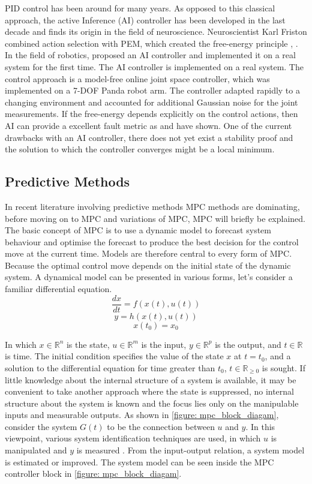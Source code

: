 \ac{PID} control has been around for many years. As opposed to this classical approach, the active Inference (AI) controller has been developed in the last decade and finds its origin in the field of neuroscience. Neuroscientist Karl Friston combined action selection with \ac{PEM}, which created the free-energy principle \cite{friston_free-energy_2009}, \cite{friston_action_2010}. In the field of robotics, \cite{pezzato_novel_2020} proposed an AI controller and implemented it on a real system for the first time. The AI controller is implemented on a real system. The control approach is a model-free online joint space controller, which was implemented on a 7-DOF Panda robot arm. The controller adapted rapidly to a changing environment and accounted for additional Gaussian noise for the joint measurements. If the free-energy depends explicitly on the control actions, then AI can provide a excellent fault metric as \cite{baioumy_fault-tolerant_2021} and \cite{pezzato_active_2021} have shown. One of the current drawbacks with an AI controller, there does not yet exist a stability proof and the solution to which the controller converges might be a local minimum. 
 
\subsection{Predictive Methods}
\label{subsection: predictive_methods}
In recent literature involving predictive methods \acf{MPC} methods are dominating, before moving on to \ac{MPC} and variations of \ac{MPC}, \ac{MPC} will briefly be explained.  The basic concept of \ac{MPC} is to use a dynamic model to forecast system behaviour and optimise the forecast to produce the best decision for the control move at the current time. Models are therefore central to every form of \ac{MPC}. Because the optimal control move depends on the initial state of the dynamic system\cite{rawlings_model_2020}. A dynamical model can be presented in various forms, let's consider a familiar differential equation. 
$$ \frac{dx}{dt} = f(x(t), u(t)) $$
$$ y = h(x(t), u(t)) $$ 
$$ x(t_0) = x_0 $$

In which $x \in \mathbb{R}^n $ is the state, $u \in \mathbb{R}^m$ is the input, $y \in \mathbb{R}^p$ is the output, and $t \in \mathbb{R}$ is time. The initial condition specifies the value of the state $x$ at $t = t_0$, and a solution to the differential equation for time greater than $t_0$, $t \in \mathbb{R}_{\geq 0}$ is sought. If little knowledge about the internal structure of a system is available, it may be convenient to take another approach where the state is suppressed, no internal structure about the system is known and the focus lies only on the manipulable inputs and measurable outputs. As shown in \cref{figure: mpc_block_diagam}, consider the system $G(t)$ to be
the connection between $u$ and $y$. In this viewpoint, various system identification techniques are used, in which $u$ is manipulated and $y$ is measured \cite{rawlings_model_2020}. From the input-output relation, a system model is estimated or improved. The system model can be seen inside the \ac{MPC} controller block in \cref{figure: mpc_block_diagam}.\\

